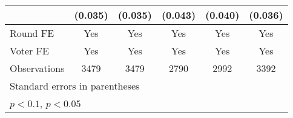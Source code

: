 \begin{table}[htbp]
\begin{tabular}{l*{5}{c}}
                    &     (0.035)       &     (0.035)       &     (0.043)       &     (0.040)       &     (0.036)       \\
[1em]
\hline  Round FE    &         Yes       &         Yes       &         Yes       &         Yes       &         Yes       \\
[1em]
Voter FE            &         Yes       &         Yes       &         Yes       &         Yes       &         Yes       \\
\hline
Observations        &        3479       &        3479       &        2790       &        2992       &        3392       \\
\hline\hline
\multicolumn{6}{l}{\footnotesize Standard errors in parentheses}\\
\multicolumn{6}{l}{\footnotesize \sym{+} \(p<0.1\), \sym{*} \(p<0.05\)}\\
\end{tabular}
\end{table}
